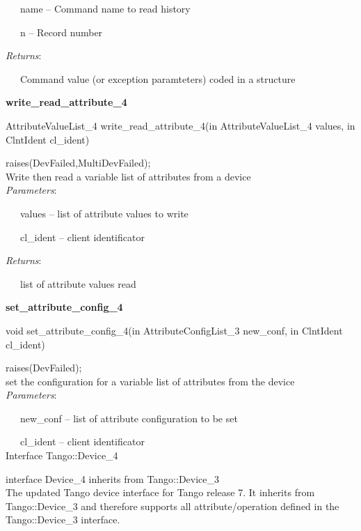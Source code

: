 ~~~name -- Command name to read history

~~~n -- Record number

\emph{Returns}:

~~~Command value (or exception paramteters) coded in a structure\\


\begin{flushleft}
\textbf{write\_read\_attribute\_4}
\par\end{flushleft}

AttributeValueList\_4 write\_read\_attribute\_4(in AttributeValueList\_4
values, in ClntIdent cl\_ident)

raises(DevFailed,MultiDevFailed);\\


Write then read a variable list of attributes from a device\\


\emph{Parameters}:

~~~values -- list of attribute values to write

~~~cl\_ident -- client identificator

\emph{Returns}:

~~~list of attribute values read\\


\begin{flushleft}
\textbf{set\_attribute\_config\_4}
\par\end{flushleft}

void set\_attribute\_config\_4(in AttributeConfigList\_3 new\_conf,
in ClntIdent cl\_ident)

raises(DevFailed);\\


set the configuration for a variable list of attributes from the device\\


\emph{Parameters}:

~~~new\_conf -- list of attribute configuration to be set

~~~cl\_ident -- client identificator\\
Interface Tango::Device\_4

interface Device\_4 inherits from Tango::Device\_3\\


The updated Tango device interface for Tango release 7. It inherits
from Tango::Device\_3 and therefore supports all attribute/operation
defined in the Tango::Device\_3 interface.


